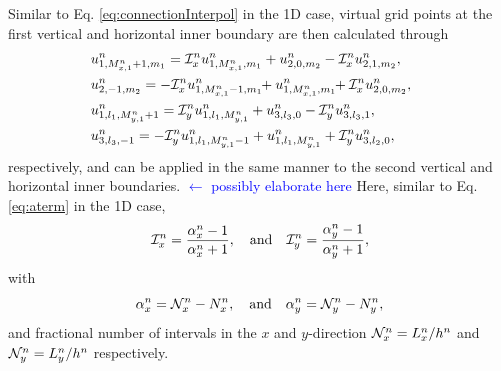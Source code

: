 \documentclass[fleqn]{jaes}
\def\SWcomment[#1]{\textcolor{blue}{#1}}
\begin{document}
Similar to Eq. \eqref{eq:connectionInterpol} in the 1D case, virtual grid points at the first vertical and horizontal inner boundary are then calculated through
\begin{subequations}\label{eq:connectionInterpol2D}
    \begin{align}
            &\!\!\!\!\!\!\!\!u_{1, M_{x,1}^n+1, m_1}^n = \Aterm_x u_{1, M_{x,1}^n, m_1}^n + u_{2, 0, m_2}^n - \Aterm_x u_{2, 1, m_2}^n,\\
            &\!\!\!\!\!\!\!\!u_{2, -1, m_2}^n = -\Aterm_x u_{1, M_{x, 1}^n-1, m_1}^n\!\! + u_{1, M_{x,1}^n, m_1}^n\!\!+\Aterm_x u_{2, 0, m_2}^n,\\
            &\!\!\!\!\!\!\!\!u_{1, l_1, M_{y,1}^n+1}^n = \Aterm_y u_{1, l_1, M_{y,1}^n}^n + u_{3, l_3, 0}^n - \Aterm_y u_{3, l_3, 1}^n,\\
            &\!\!\!\!\!\!\!\!u_{3, l_3, -1}^n = -\Aterm_y u_{1, l_1, M_{y, 1}^n-1}^n + u_{1, l_1, M_{y,1}^n}^n+\Aterm_y u_{3, l_2, 0}^n,
    \end{align}
\end{subequations}
respectively, and can be applied in the same manner to the second vertical and horizontal inner boundaries. \SWcomment[$\leftarrow$ possibly elaborate here] Here, similar to Eq. \eqref{eq:aterm} in the 1D case, 
\begin{equation}\label{eq:axayDef}
    \Aterm_x = \frac{\alpha_x^n-1}{\alpha_x^n+1}, \qaq \Aterm_y = \frac{\alpha_y^n-1}{\alpha_y^n+1},
\end{equation}
with 
\begin{equation}
    \alpha_x^n = \Nfrac_x^n - N_x^n, \qaq \alpha_y^n = \Nfrac_y^n - N_y^n,
\end{equation}
and fractional number of intervals in the $x$ and $y$-direction $\mathcal{N}_x^n = L_x^n / h^n$ and $\mathcal{N}_y^n = L_y^n / h^n$ respectively.
\end{document}
